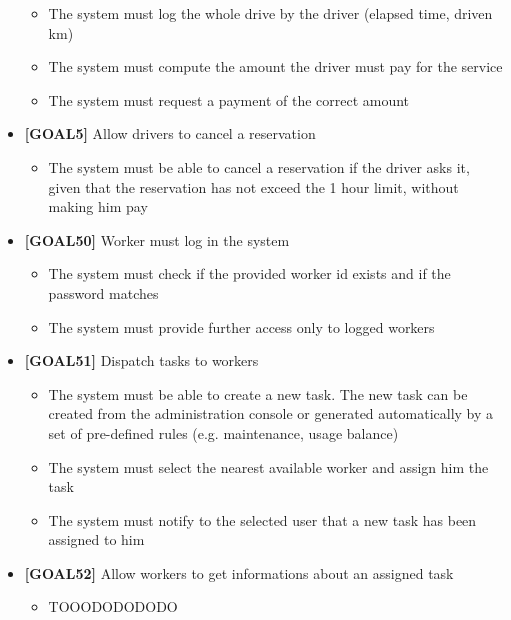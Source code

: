 \begin{itemize}
	\begin{itemize}
	\item The system must log the whole drive by the driver (elapsed time, driven km)
	\item The system must compute the amount the driver must pay for the service
	\item The system must request a payment of the correct amount 
	\end{itemize}
\item \textbf{[GOAL5]} Allow drivers to cancel a reservation
	\begin{itemize}
	\item The system must be able to cancel a reservation if the driver asks it, given that the reservation has not exceed the 1 hour limit, without making him pay
	\end{itemize}
\item \textbf{[GOAL50]} Worker must log in the system
	\begin{itemize}
	\item The system must check if the provided worker id exists and if the password matches
	\item The system must provide further access only to logged workers
	\end{itemize}
\item \textbf{[GOAL51]} Dispatch tasks to workers
	\begin{itemize}
	\item The system must be able to create a new task. The new task can be created from the administration console or generated automatically by a set of pre-defined rules (e.g. maintenance, usage balance)
	\item The system must select the nearest available worker and assign him the task
	\item The system must notify to the selected user that a new task has been assigned to him
	\end{itemize}
\item \textbf{[GOAL52]} Allow workers to get informations about an assigned task
	\begin{itemize}
	\item TOOODODODODO
	\end{itemize}
\end{itemize}
